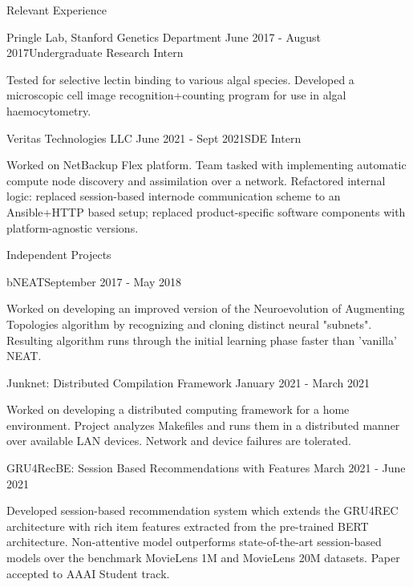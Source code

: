 \documentclass{resume} %
\begin{document}
\begin{resumeSection}{Relevant Experience} \itemsep -10pt

\begin{resumeSubsection}{Pringle Lab, Stanford Genetics Department}
	{June 2017 - August 2017}{Undergraduate Research Intern}{}
\item Tested for selective lectin binding to various algal species. Developed a
	microscopic cell image recognition+counting program for use in algal
	haemocytometry.
\end{resumeSubsection}
\begin{resumeSubsection}{Veritas Technologies LLC}
	{June 2021 - Sept 2021}{SDE Intern}{}
\item Worked on NetBackup Flex platform. Team tasked with implementing
	automatic compute node discovery and assimilation over a network.
	Refactored internal logic: replaced session-based internode
	communication scheme to an Ansible+HTTP based setup; replaced
	product-specific software components with platform-agnostic versions. 
\end{resumeSubsection}

\end{resumeSection}


\begin{resumeSection}{Independent Projects} \itemsep -10pt

\begin{resumeSubsection}{bNEAT}{September 2017 - May 2018}{}{}
\item Worked on developing an improved version of the Neuroevolution of
	Augmenting Topologies algorithm by recognizing and cloning distinct
	neural "subnets". Resulting algorithm runs through the initial learning
	phase faster than 'vanilla' NEAT.
\end{resumeSubsection}
\begin{resumeSubsection}{Junknet: Distributed Compilation Framework}
	{January 2021 - March 2021}{}{}
\item Worked on developing a distributed computing framework for a home
	environment. Project analyzes Makefiles and runs them in a distributed
	manner over available LAN devices. Network and device failures are
	tolerated.
\end{resumeSubsection}
\begin{resumeSubsection}{GRU4RecBE: Session Based Recommendations with Features}
	{March 2021 - June 2021}{}{}
\item Developed session-based recommendation system which extends the GRU4REC
	architecture with rich item features extracted from the pre-trained
	BERT architecture. Non-attentive model outperforms state-of-the-art
	session-based models over the benchmark MovieLens 1M and MovieLens 20M
	datasets. Paper accepted to AAAI Student track. 
\end{resumeSubsection}

\end{resumeSection}
\end{document}

